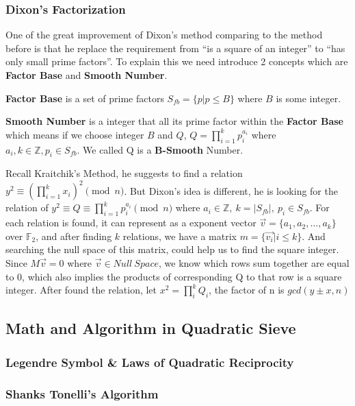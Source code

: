 \documentclass[12pt]{article} %
\begin{document}
\subsubsection {Dixon's Factorization}
One of the great improvement of Dixon's method comparing to the method before is that he replace the requirement from ``is a square of an integer'' to ``has only small prime factors''. To explain this we need introduce 2 concepts which are \textbf{Factor Base} and \textbf{Smooth Number}.

\textbf{Factor Base} is a set of prime factors $S_{fb}=\{p | p \le B\}$ where $B$ is some integer.

\textbf{Smooth Number} is a integer that all its prime factor within the \textbf{Factor Base} which means if we choose integer $B$ and $Q$, $Q = \prod_{i=1}^k{p_i^{a_i}}$ where $a_i, k \in \mathbb{Z}, p_i \in S_{fb}$. We called Q is a \textbf{B-Smooth} Number.

Recall Kraitchik's Method, he suggests to find a relation $y^2 \equiv \left (\prod_{i=1}^k{x_i}\right)^2 \pmod{n}$. But Dixon's idea is different, he is looking for the relation of $\displaystyle y^2 \equiv Q \equiv \prod_{i=1}^k{p_i^{a_i}} \pmod{n}$ where $a_i \in \mathbb{Z},\ k=|S_{fb}|,\ p_i \in S_{fb}$. For each relation is found, it can represent as a exponent vector $\vec{v} = \{a_1, a_2, \dots, a_k\}$ over $\mathbb{F}_{2}$, and after finding $k$ relations, we have a matrix $m = \{\vec{v_i} | i \le k\}$. And searching the null space of this matrix, could help us to find the square integer. Since $M\vec{v} = 0$ where $\vec{v} \in Null\ Space$, we know which rows sum together are equal to 0, which also implies the products of corresponding Q to that row is a square integer. After found the relation, let $x^2 = \prod_i^k{Q_i}$, the factor of n is $gcd(y\pm x, n)$

\subsection {Math and Algorithm in Quadratic Sieve}

\subsubsection{Legendre Symbol \& Laws of Quadratic Reciprocity}



\subsubsection{Shanks Tonelli's Algorithm}
\end{document}
